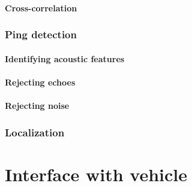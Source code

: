 \documentclass[10pt]{article}
\begin{document}
\paragraph{Cross-correlation}

\subsubsection{Ping detection}

\paragraph{Identifying acoustic features}

\paragraph{Rejecting echoes}

\paragraph{Rejecting noise}

\subsubsection{Localization}

\section{Interface with vehicle}

\clearpage



\end{document}
